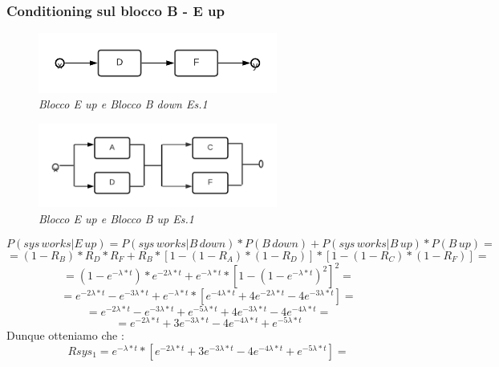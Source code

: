 \subsubsection{Conditioning sul blocco B - E up}
\begin{figure}[H]
	\centering
	\includegraphics[width=0.7\textwidth]{img/hw5/b_down.png}
	\caption{\textit{Blocco E up e Blocco B down Es.1}}
\end{figure}
\begin{figure}[H]
	\centering
	\includegraphics[width=0.7\textwidth]{img/hw5/b_up.png}
	\caption{\textit{Blocco E up e Blocco B up Es.1}}
\end{figure}
\begin{equation*}
	P(sys\,works|E\,up) = P(sys\,works|B\,down)*P(B\,down)+P(sys\,works|B\,up)*P(B\,up) =
\end{equation*}
\begin{equation*}
	= (1-R_B)*R_D*R_F + R_B*[1-(1-R_A)*(1-R_D)]*[1-(1-R_C)*(1-R_F)] =
\end{equation*}
\begin{equation*}
	= (1-e^{-\lambda*t})*e^{-2\lambda*t} + e^{-\lambda*t}*[1-(1-e^{-\lambda*t})^{2}]^{2} =
\end{equation*}
\begin{equation*}
	= e^{-2\lambda*t} - e^{-3\lambda*t} + e^{-\lambda*t}*[e^{-4\lambda*t}+4e^{-2\lambda*t}-4e^{-3\lambda*t}] =
\end{equation*}
\begin{equation*}
	= e^{-2\lambda*t} - e^{-3\lambda*t} + e^{-5\lambda*t}+4e^{-3\lambda*t}-4e^{-4\lambda*t} =
\end{equation*}
\begin{equation*}
	= e^{-2\lambda*t} + 3e^{-3\lambda*t} -4e^{-4\lambda*t} +e^{-5\lambda*t} 
\end{equation*}
Dunque otteniamo che :
\begin{equation*}
	Rsys_1 = e^{-\lambda*t}*[e^{-2\lambda*t} + 3e^{-3\lambda*t} -4e^{-4\lambda*t} +e^{-5\lambda*t}] =
\end{equation*}
